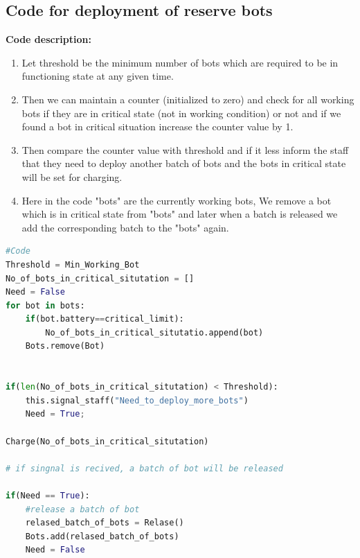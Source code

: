 \documentclass{article}
\begin{document}
\subsection{Code for deployment of reserve bots}
\label{code:j}
\textbf{Code description: }
\begin{enumerate}
\item Let threshold be the minimum number of bots which are required to be in functioning state at any given time.
\item Then we can maintain a counter (initialized to zero) and check for all working bots if they are in critical state (not in working condition) or not and if we found a bot in critical situation increase the counter value by 1.
\item Then compare the counter value with threshold and if it less inform the staff that they need to deploy another batch of bots and the bots in critical state will be set for charging.
\item Here in the code "bots" are the currently working bots, We remove a bot which is in critical state from "bots" and later when a batch is released we add the corresponding batch to the "bots" again.
\end{enumerate}
\begin{lstlisting}[language=Python, caption=Deployment of reserve bots]
#Code
Threshold = Min_Working_Bot
No_of_bots_in_critical_situtation = []
Need = False
for bot in bots:
    if(bot.battery==critical_limit):
        No_of_bots_in_critical_situtatio.append(bot)
	Bots.remove(Bot)

        
if(len(No_of_bots_in_critical_situtation) < Threshold):
    this.signal_staff("Need_to_deploy_more_bots")
    Need = True;
    
Charge(No_of_bots_in_critical_situtation)
    
# if singnal is recived, a batch of bot will be released

if(Need == True):
    #release a batch of bot
    relased_batch_of_bots = Relase()
    Bots.add(relased_batch_of_bots)
    Need = False
    
\end{lstlisting}
\end{document}
